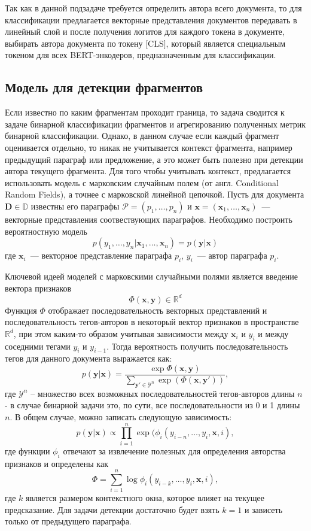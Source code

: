 Так как в данной подзадаче требуется определить автора всего документа, то для классификации предлагается векторные представления документов передавать в линейный слой и после получения логитов для каждого токена в документе, выбирать автора документа по токену $[$CLS$]$, который является специальным токеном для всех BERT-энкодеров, предназначенным для классификации.



\subsection{Модель для детекции фрагментов}
\label{fragments}

Если известно по каким фрагментам проходит граница, то задача сводится к задаче бинарной классификации фрагментов и агрегированию полученных метрик бинарной классификации. Однако, в данном случае если каждый фрагмент оценивается отдельно, то никак не учитывается контекст фрагмента, например предыдущий параграф или предложение, а это может быть полезно при детекции автора текущего фрагмента. Для того чтобы учитывать контекст, предлагается использовать модель с марковским случайным полем (от англ. Conditional Random Fields), а точнее с марковской линейной цепочкой.
Пусть для документа $\mathbf{D} \in \mathbb{D}$ известны его параграфы $\mathcal{P} = (p_1, \dots, p_n)$ и $\mathbf{x} = (\mathbf{x}_1, \dots, \mathbf{x}_n)$~---векторные представления соотвествующих параграфов. Необходимо построить вероятностную модель $$p(y_1, \dots, y_n | \mathbf{x}_1, \dots, \mathbf{x}_n) = p(\mathbf{y} | \mathbf{x})$$
где $\mathbf{x}_i$~--- векторное представление параграфа $p_i$, $y_i$~--- автор параграфа $p_i$.

Ключевой идеей моделей с марковскими случайными полями  является введение вектора признаков
$$\Phi(\mathbf{x}, \mathbf{y}) \in \mathbb{R}^d$$
Функция $\Phi$ отображает последовательность векторных представлений и последовательность тегов-авторов в некоторый вектор признаков в пространстве $\mathbb{R}^d$, при этом каким-то образом учитывая зависимости между $\mathbf{x}_i$ и  $y_i$ и между соседними тегами $y_i$ и $y_{i-1}$.
Тогда вероятность получить последовательность тегов для данного документа выражается как:
\begin{equation}
\label{probability}
    p(\mathbf{y} | \mathbf{x}) = \frac{\exp\Phi(\mathbf{x},\mathbf{y})}{\sum\limits_{\mathbf{y}' \in \mathcal{Y}^n}\exp(\Phi(\mathbf{x},\mathbf{y}'))},
\end{equation}
где $\mathcal{Y}^n$ – множество всех возможных последовательностей тегов-авторов длины $n$  - в случае бинарной задачи это, по сути, все последовательности из 0 и 1 длины $n$.
В  общем случае, можно записать следующую зависимость:
$$ p(\mathbf{y} | \mathbf{x}) \propto  \prod_{i=1}^n \exp(\phi_i(y_{i-n},\dots, y_i, \mathbf{x}, i),$$
где функции $\phi_i$ отвечают за извлечение полезных для определения авторства признаков и определены как 
$$\Phi = \sum_{i=1}^n \log \phi_i(y_{i-k},\dots, y_i, \mathbf{x}, i),$$
где $k$ является размером контекстного окна, которое влияет на текущее предсказание. 
Для  задачи детекции достаточно будет взять $k = 1$ и зависеть только от предыдущего параграфа.

